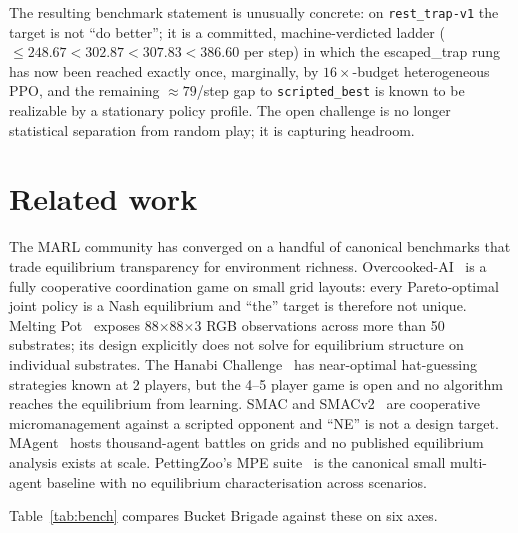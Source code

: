 \documentclass{anvil-paper}
\begin{document}
The resulting benchmark statement is unusually concrete: on
\texttt{rest\_trap-v1} the target is not ``do better''; it is a
committed, machine-verdicted ladder
(${\leq}248.67 < 302.87 < 307.83 < 386.60$ per step) in which the
\textsf{escaped\_trap} rung has now been reached exactly once,
marginally, by $16{\times}$-budget heterogeneous PPO, and the remaining
${\approx}79$/step gap to \texttt{scripted\_best} is known to be
realizable by a stationary policy profile. The open challenge is no
longer statistical separation from random play; it is capturing
headroom.

\section{Related work}
\label{sec:related}

The MARL community has converged on a handful of canonical benchmarks that
trade equilibrium transparency for environment richness.
Overcooked-AI~\citep{overcooked2019} is a fully cooperative coordination
game on small grid layouts: every Pareto-optimal joint policy is a Nash
equilibrium and ``the'' target is therefore not unique. Melting
Pot~\citep{meltingpot2021} exposes 88$\times$88$\times$3 RGB observations
across more than 50 substrates; its design explicitly does not solve for
equilibrium structure on individual substrates. The Hanabi
Challenge~\citep{hanabi2020} has near-optimal hat-guessing strategies known
at 2 players, but the 4--5 player game is open and no algorithm reaches the
equilibrium from learning. SMAC and SMACv2~\citep{smac2019,smacv2_2023} are
cooperative micromanagement against a scripted opponent and ``NE'' is not a
design target. MAgent~\citep{magent2018} hosts thousand-agent battles on
grids and no published equilibrium analysis exists at scale.
PettingZoo's MPE suite~\citep{pettingzoo2021} is the canonical small
multi-agent baseline with no equilibrium characterisation across scenarios.

Table~\ref{tab:bench} compares Bucket Brigade against these on six axes.
\end{document}
